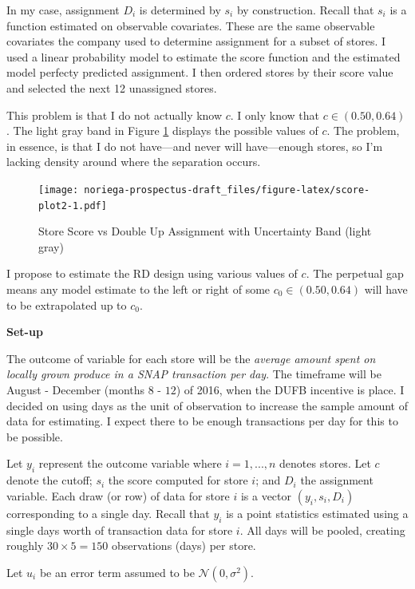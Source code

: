 \documentclass[12pt,letterpaperpaper,]{book}
\begin{document}
In my case, assignment \(D_i\) is determined by \(s_i\) by construction.
Recall that \(s_i\) is a function estimated on observable covariates.
These are the same observable covariates the company used to determine
assignment for a subset of stores. I used a linear probability model to
estimate the score function and the estimated model perfecty predicted
assignment. I then ordered stores by their score value and selected the
next 12 unassigned stores.

This problem is that I do not actually know \(c\). I only know that
\(c \in (0.50, 0.64)\). The light gray band in Figure
\ref{fig:score-plot2} displays the possible values of \(c\). The
problem, in essence, is that I do not have---and never will
have---enough stores, so I'm lacking density around where the separation
occurs.

\begin{figure}
\centering
\texttt{[image: noriega-prospectus-draft\_files/figure-latex/score-plot2-1.pdf]}
\caption{\label{fig:score-plot2}Store Score vs Double Up Assignment with
Uncertainty Band (light gray)}
\end{figure}

I propose to estimate the RD design using various values of \(c\). The
perpetual gap means any model estimate to the left or right of some
\(c_0 \in (0.50, 0.64)\) will have to be extrapolated up to \(c_0\).

\textbf{Set-up}

The outcome of variable for each store will be the \emph{average amount
spent on locally grown produce in a SNAP transaction per day}. The
timeframe will be August - December (months \(8\) - \(12\)) of 2016,
when the DUFB incentive is place. I decided on using days as the unit of
observation to increase the sample amount of data for estimating. I
expect there to be enough transactions per day for this to be possible.

Let \(y_{i}\) represent the outcome variable where \(i=1,...,n\) denotes
stores. Let \(c\) denote the cutoff; \(s_i\) the score computed for
store \(i\); and \(D_i\) the assignment variable. Each draw (or row) of
data for store \(i\) is a vector \((y_i, s_i, D_i)\) corresponding to a
single day. Recall that \(y_i\) is a point statistics estimated using a
single days worth of transaction data for store \(i\). All days will be
pooled, creating roughly \(30\times5=150\) observations (days) per
store.

Let \(u_i\) be an error term assumed to be \(\mathcal{N}(0, \sigma^2)\).
\end{document}
